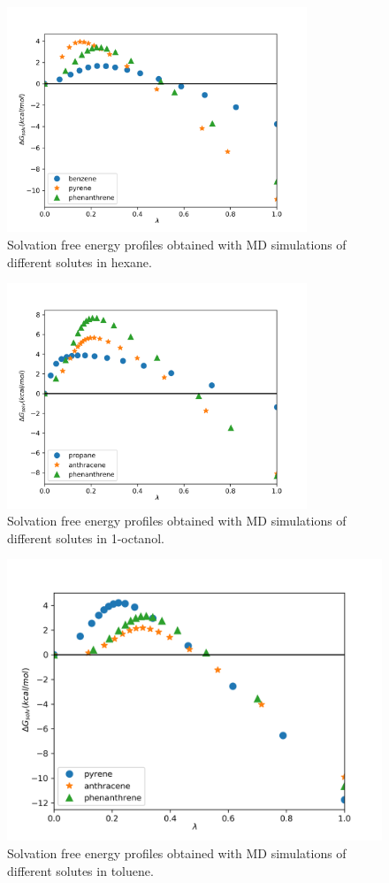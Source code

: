 \begin{figure}[H]
\centering
\includegraphics[width=0.8\textwidth]{Figures/hex}
\caption{Solvation free energy profiles obtained with MD simulations of different solutes in hexane.}
\label{fig:hex}
\end{figure}

\begin{figure}[H]
    \centering
    \includegraphics[width=0.8\textwidth]{Figures/oct}
    \caption{Solvation free energy profiles obtained with MD simulations of different solutes in 1-octanol.}
    \label{fig:oct}
\end{figure}

\begin{figure}[H]
    \centering
    \includegraphics[width=0.8\linewidth]{Figures/tol}
    \caption{Solvation free energy profiles obtained with MD simulations of different solutes in toluene. }
    \label{fig:tol}
\end{figure}

